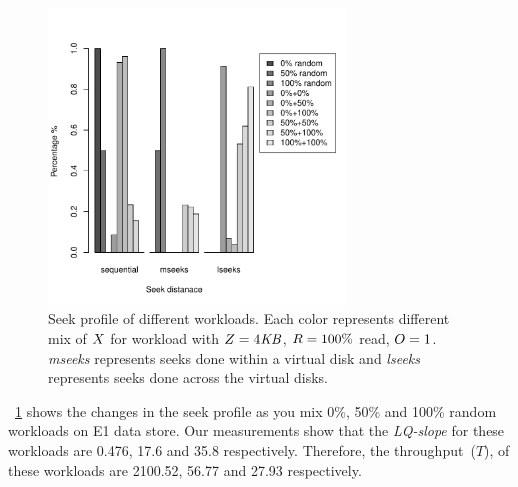 \begin{figure}[!t]
\centering
\includegraphics[width=0.7\textwidth]{figure/seek_profile.pdf}
\caption{Seek profile of different workloads.
Each color represents different mix of $X$ for workload with $Z=4\mathit{KB}$, $R=100\%$ read, $O=1$.
\emph{mseeks} represents seeks done within a virtual disk and \emph{lseeks} represents seeks done across the virtual disks.}
\label{seekpr}
\end{figure}
\figurename~\ref{seekpr} shows the changes in the seek profile as you mix 0\%, 50\% and 100\% random workloads on E1 data store.
Our measurements show that the \emph{LQ-slope} for these workloads are 0.476, 17.6 and 35.8 respectively.
Therefore, the throughput~($T$), of these workloads are 2100.52, 56.77 and 27.93 respectively.

